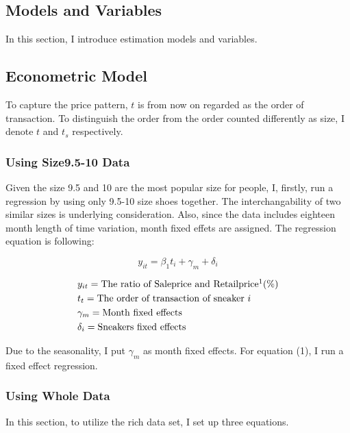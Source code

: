 \documentclass[a4paper]{article}
\theoremstyle{definition}
\theoremstyle{definition}
\theoremstyle{remark}
\begin{document}
\begin{large}
\section{Models and Variables}

In this section, I introduce estimation models and variables.  

\subsection{Econometric Model}

To capture the price pattern, $ t $ is from now on regarded as the order of transaction. To distinguish the order from the order counted differently as size, I denote $ t $ and $ t_{s} $ respectively. 

\subsubsection{Using Size9.5-10 Data}

Given the size 9.5 and 10 are the most popular size for people, I, firstly, run a regression by using only 9.5-10 size shoes together. The interchangability of two similar sizes is underlying consideration. Also, since the data includes eighteen month length of time variation, month fixed effets are assigned. The regression equation is following:

\begin{equation}
	y_{it} = \beta_{1}t_{i} + \gamma_{m} + \delta_{i}
\end{equation}

\begin{align*}
	& y_{it} = \text{The ratio of Saleprice and Retailprice}\footnotemark  (\%) \\
	& t_{t} = \text{The order of transaction of sneaker $ i $} \\
	& \gamma_{m} = \text{Month fixed effects} \\
	& \delta_{i} = \text{Sneakers fixed effects}
\end{align*}

Due to the seasonality, I put $ \gamma_{m} $ as month fixed effects. For equation (1), I run a fixed effect regression.

\subsubsection{Using Whole Data}

In this section, to utilize the rich data set, I set up three equations.


\end{large}
\end{document}
